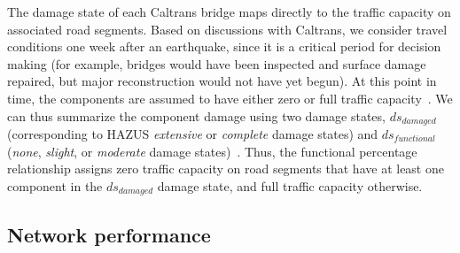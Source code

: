 The damage state of each Caltrans bridge maps directly to the traffic capacity on associated road segments. Based on discussions with Caltrans, we consider travel conditions one week after an earthquake, since it is a critical period for decision making (for example, bridges would have been inspected and surface damage repaired, but major reconstruction would not have yet begun). At this point in time, the components are assumed to have either zero or full traffic capacity~\cite{werner_redars_2006}. We can thus summarize the component damage using two damage states, $ds_{damaged}$ (corresponding to HAZUS \emph{extensive} or \emph{complete} damage states) and $ds_{functional}$ (\emph{none}, \emph{slight}, or \emph{moderate} damage states)~\cite{werner_redars_2006}. Thus, the functional percentage relationship assigns zero traffic capacity on road segments that have at least one component in the $ds_{damaged}$ damage state, and full traffic capacity otherwise.  %




\subsection{Network performance}
